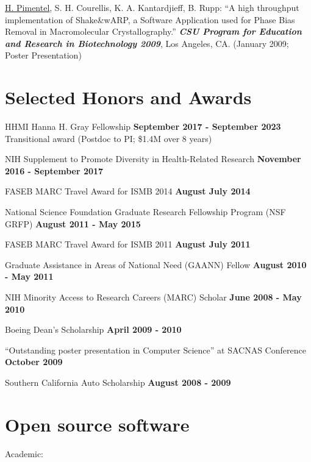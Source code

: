 \documentclass[overlapped]{res}
\begin{document}
\begin{resume}
\underline{H. Pimentel}, S. H. Courellis, K. A. Kantardjieff, B. Rupp:
``A high throughput implementation of Shake\&wARP, a Software
Application used for Phase Bias Removal in Macromolecular
Crystallography.'' {\bf \emph{CSU Program for Education and Research
   in Biotechnology 2009}}, Los Angeles, CA. (January 2009; Poster Presentation)

\newpage

\section{\sc Selected Honors and Awards}

HHMI Hanna H. Gray Fellowship \hfill {\bf September 2017 - September 2023}\\
Transitional award (Postdoc to PI; \$1.4M over 8 years)

NIH Supplement to Promote Diversity in Health-Related Research \hfill {\bf November 2016 - September 2017}

FASEB MARC Travel Award for ISMB 2014 \hfill {\bf August
  July 2014}

National Science Foundation Graduate Research Fellowship Program (NSF GRFP)
\hfill {\bf August 2011 - May 2015}

FASEB MARC Travel Award for ISMB 2011 \hfill {\bf August
  July 2011}

Graduate Assistance in Areas of National Need (GAANN) Fellow \hfill {\bf August
  2010 - May 2011}

NIH Minority Access to Research Careers (MARC) Scholar \hfill {\bf
  June 2008 - May 2010}

Boeing Dean's Scholarship \hfill {\bf April 2009 - 2010}

``Outstanding poster presentation in Computer Science'' at SACNAS
Conference \hfill {\bf October 2009}

Southern California Auto Scholarship \hfill {\bf August 2008 - 2009}

\section{\sc Open source software}

Academic:


\end{resume}
\end{document}
